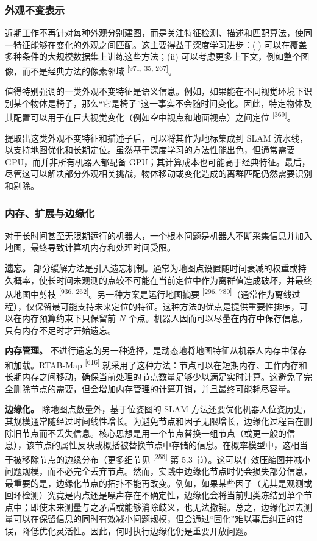 \subsubsection{外观不变表示}

近期工作不再针对每种外观分别建图，而是关注特征检测、描述和匹配算法，使同一特征能够在变化的外观之间匹配。这主要得益于深度学习进步：(i) 可以在覆盖多种条件的大规模数据集上训练这些方法；(ii) 可以考虑更多上下文，例如整个图像，而不是经典方法的像素邻域 \textsuperscript{[971, 35, 267]}。

值得特别强调的一类外观不变特征是语义信息。例如，如果能在不同视觉环境下识别某个物体是椅子，那么“它是椅子”这一事实不会随时间变化。因此，特定物体及其配置可以用于在巨大视觉变化（例如空中视点和地面视点）之间定位 \textsuperscript{[369]}。

提取出这类外观不变特征和描述子后，可以将其作为地标集成到 SLAM 流水线，以支持地图优化和长期定位。虽然基于深度学习的方法性能出色，但通常需要 GPU，而并非所有机器人都配备 GPU；其计算成本也可能高于经典特征。最后，尽管这可以解决部分外观相关挑战，物体移动或变化造成的离群匹配仍然需要识别和剔除。

\subsubsection{内存、扩展与边缘化}

对于长时间甚至无限期运行的机器人，一个根本问题是机器人不断采集信息并加入地图，最终导致计算机内存和处理时间受限。

\textbf{遗忘。} 部分缓解方法是引入遗忘机制。通常为地图点设置随时间衰减的权重或持久概率，使长时间未观测的点较不可能在当前定位中作为离群值造成破坏，并最终从地图中剪枝 \textsuperscript{[936, 262]}。另一种方案是运行地图摘要 \textsuperscript{[296, 780]}（通常作为离线过程），仅保留最可能支持未来定位的特征。这种方法的优点是提供重要性排序，可以在内存预算约束下只保留前 $N$ 个点。机器人因而可以尽量在内存中保存信息，只有内存不足时才开始遗忘。

\textbf{内存管理。} 不进行遗忘的另一种选择，是动态地将地图特征从机器人内存中保存和加载。RTAB-Map \textsuperscript{[616]} 就采用了这种方法：节点可以在短期内存、工作内存和长期内存之间移动，确保当前处理的节点数量足够少以满足实时计算。这避免了完全删除节点的需要，但会增加内存管理的计算开销，并且最终可能耗尽容量。

\textbf{边缘化。} 除地图点数量外，基于位姿图的 SLAM 方法还要优化机器人位姿历史，其规模通常随经过时间线性增长。为避免节点和因子无限增长，边缘化过程旨在删除旧节点而不丢失信息。核心思想是用一个节点替换一组节点（或更一般的信息），该节点的属性反映或概括被替换节点中存储的信息。在概率模型中，这相当于被移除节点的边缘分布（更多细节见 \textsuperscript{[255]} 第 5.3 节）。这可以有效压缩图并减小问题规模，而不必完全丢弃节点。然而，实践中边缘化节点时仍会损失部分信息，最重要的是，边缘化节点的拓扑不能再改变。例如，如果某些因子（尤其是观测或回环检测）究竟是内点还是噪声存在不确定性，边缘化会将当前归类冻结到单个节点中；即使未来测量与之矛盾或能够消除歧义，也无法撤销。总之，边缘化过去测量可以在保留信息的同时有效减小问题规模，但会通过“固化”难以事后纠正的错误，降低优化灵活性。因此，何时执行边缘化仍是重要开放问题。

